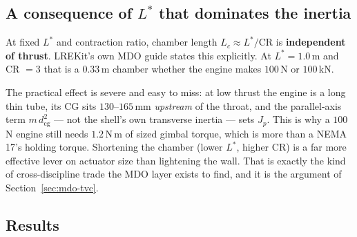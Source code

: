 \documentclass[11pt]{article}
\begin{document}
\subsection{A consequence of $L^*$ that dominates the inertia}

\begin{warnbox}
At fixed $L^*$ and contraction ratio, chamber length $L_c \approx L^*/\mathrm{CR}$
is \textbf{independent of thrust}. LREKit's own MDO guide states this
explicitly. At $L^*=1.0$\,m and CR $=3$ that is a $0.33$\,m chamber whether
the engine makes $100$\,N or $100$\,kN.
\end{warnbox}

The practical effect is severe and easy to miss: at low thrust the engine is
a long thin tube, its CG sits $130$--$165$\,mm \emph{upstream} of the throat,
and the parallel-axis term $m\,d_{\text{cg}}^2$ --- not the shell's own
transverse inertia --- sets $J_p$. This is why a $100$\,N engine still needs
$1.2$\,N\,m of sized gimbal torque, which is more than a NEMA 17's holding
torque. Shortening the chamber (lower $L^*$, higher CR) is a far more
effective lever on actuator size than lightening the wall. That is exactly
the kind of cross-discipline trade the MDO layer exists to find, and it is
the argument of Section~\ref{sec:mdo-tvc}.

\subsection{Results}
\end{document}
